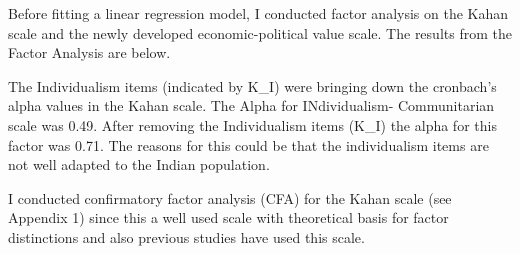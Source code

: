 \documentclass[
]{article}
\begin{document}
Before fitting a linear regression model, I conducted factor analysis on
the Kahan scale and the newly developed economic-political value scale.
The results from the Factor Analysis are below.

The Individualism items (indicated by K\_I) were bringing down the
cronbach's alpha values in the Kahan scale. The Alpha for INdividualism-
Communitarian scale was 0.49. After removing the Individualism items
(K\_I) the alpha for this factor was 0.71. The reasons for this could be
that the individualism items are not well adapted to the Indian
population.

I conducted confirmatory factor analysis (CFA) for the Kahan scale (see
Appendix 1) since this a well used scale with theoretical basis for
factor distinctions and also previous studies have used this scale.
\end{document}
